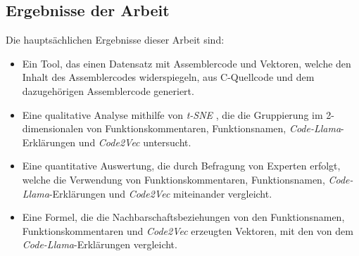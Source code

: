 \documentclass[12pt,letterpaper,ngerman]{article}
\begin{document}
\subsection{Ergebnisse der Arbeit}
Die hauptsächlichen Ergebnisse dieser Arbeit sind:
\begin{itemize}
  \item Ein Tool, das einen Datensatz mit Assemblercode und
    Vektoren, welche den Inhalt des Assemblercodes widerspiegeln,
    aus C-Quellcode und dem dazugehörigen Assemblercode generiert.
  \item Eine qualitative Analyse mithilfe von
    \textit{t-SNE} \cite{JMLR:v9:vandermaaten08a}, die die
    Gruppierung im 2-dimensionalen von 
    Funktionskommentaren, Funktionsnamen, 
    \textit{Code-Llama}-Erklärungen
    \cite{rozière2024codellamaopenfoundation}
    und  \textit{Code2Vec}  \cite{code2vec}
    untersucht.
  \item Eine quantitative Auswertung, die durch Befragung von 
    Experten erfolgt, welche die Verwendung von Funktionskommentaren,
    Funktionsnamen, \textit{Code-Llama}-Erklärungen und 
    \textit{Code2Vec}  miteinander vergleicht.
  \item Eine Formel, die die Nachbarschaftsbeziehungen von
    den Funktionsnamen, Funktionskommentaren  und 
    \textit{Code2Vec} erzeugten Vektoren, 
    mit den von dem \textit{Code-Llama}-Erklärungen vergleicht.
\end{itemize}
\pagebreak
\end{document}
